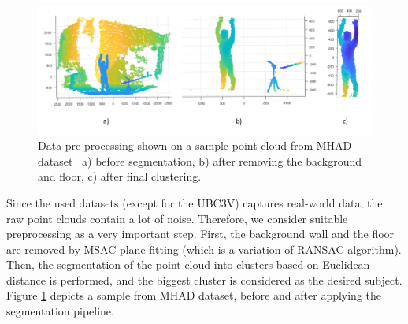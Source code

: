 
\vspace{5mm}

\begin{figure}[H]
\begin{center}
  \includegraphics[width=\textwidth]{images/implementation/mhad.png}
  \caption[Data pre-processing shown on a sample point cloud from MHAD dataset~\cite{Vidal:2013:BMC:2478277.2478412}.]{ Data pre-processing shown on a sample point cloud from MHAD dataset~\cite{Vidal:2013:BMC:2478277.2478412} a) before segmentation, b) after removing the background and floor, c) after final clustering.}
  \label{fig:mhad}
\end{center}
\end{figure}

\noindent
Since the used datasets (except for the UBC3V) captures real-world data, the raw point clouds contain a lot of noise. Therefore, we consider suitable preprocessing as a very important step. First, the background wall and the floor are removed by MSAC plane fitting (which is a variation of RANSAC algorithm). Then, the segmentation of the point cloud into clusters based on Euclidean distance is performed, and the biggest cluster is considered as the desired subject. Figure \ref{fig:mhad} depicts a sample from MHAD dataset, before and after applying the segmentation pipeline.%
\par

